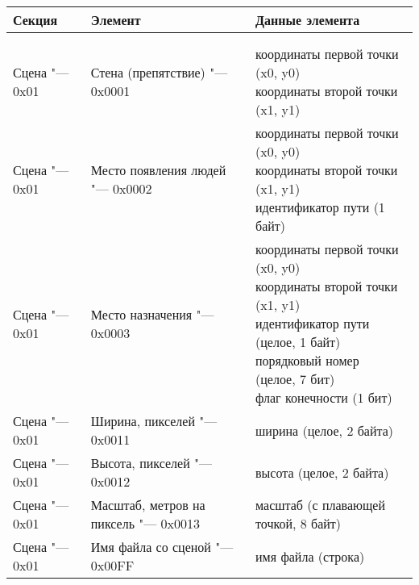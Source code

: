 \begin{longtable}[ht]{| >{\centering}m{}
                      | >{\centering}m{}
                      | >{\centering\arraybackslash}m{}|}
\hline Секция & Элемент & Данные элемента \tabularnewline
\endfirsthead
\captionsetup{labelformat=stbtablecont,justification=raggedright}
\caption[]{}\tabularnewline
\hline 1 & 2 & 3 \tabularnewline
\endhead
  \hline Сцена "--- 0x01 & Стена (препятствие) "--- 0x0001 & \specialcell{координаты первой точки\\
                                                                       (x0, y0)\\
                                                                       координаты второй точки\\
                                                                       (x1, y1)} \tabularnewline
  \hline Сцена "--- 0x01 & Место появления людей "--- 0x0002 & \specialcell{координаты первой точки\\
                                                                           (x0, y0)\\
                                                                           координаты второй точки\\
                                                                           (x1, y1)\\
                                                                           идентификатор пути (1 байт)} \tabularnewline
  \hline Сцена "--- 0x01 & Место назначения "--- 0x0003 & \specialcell{координаты первой точки\\
                                                                       (x0, y0)\\
                                                                       координаты второй точки\\
                                                                       (x1, y1)\\
                                                                       идентификатор пути\\
                                                                       (целое, 1 байт)\\
                                                                       порядковый номер\\
                                                                       (целое, 7 бит)\\
                                                                       флаг конечности (1 бит)} \tabularnewline
  \hline Сцена "--- 0x01 & Ширина, пикселей "--- 0x0011 & ширина (целое, 2 байта) \tabularnewline
  \hline Сцена "--- 0x01 & Высота, пикселей "--- 0x0012 & высота (целое, 2 байта) \tabularnewline
  \hline Сцена "--- 0x01 & Масштаб, метров на пиксель "--- 0x0013 & масштаб (с плавающей точкой, 8 байт) \tabularnewline
  \hline Сцена "--- 0x01 & Имя файла со сценой "--- 0x00FF & имя файла (строка) \tabularnewline


\end{longtable}
